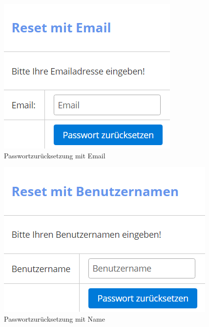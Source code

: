 \documentclass[enabledeprecatedfontcommands,fontsize=12pt,paper=a4,twoside]{scrartcl}
\begin{document}
\begin{figure}[h!]
\begin{center}
 \includegraphics[width=\textwidth]{screenshots/allgemein/resetemail.png}
  \caption{Passwortzurücksetzung mit Email}
  \label{fig:boat1}
\end{center}
\end{figure}

\begin{figure}[h!]
\begin{center}
 \includegraphics[width=\textwidth]{screenshots/allgemein/resetname.png}
  \caption{Passwortzurücksetzung mit Name}
  \label{fig:boat1}
\end{center}
\end{figure}
\end{document}
